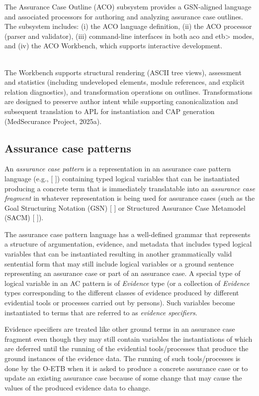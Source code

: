 \documentclass[12pt,twoside,a4paper]{article}
\begin{document}
The Assurance Case Outline (ACO) subsystem provides a GSN-aligned language and associated processors for authoring and analyzing assurance case outlines. The subsystem includes: (i) the ACO language definition, (ii) the ACO processor (parser and validator), (iii) command-line interfaces in both aco and etb\textgreater{} modes, and (iv) the ACO Workbench, which supports interactive development.\\
\strut \\
The Workbench supports structural rendering (ASCII tree views), assessment and statistics (including undeveloped elements, module references, and explicit relation diagnostics), and transformation operations on outlines. Transformations are designed to preserve author intent while supporting canonicalization and subsequent translation to APL for instantiation and CAP generation (MedSecurance Project, 2025a).

\hypertarget{assurance-case-patterns}{%
\subsection{Assurance case patterns}\label{assurance-case-patterns}}

An \emph{assurance case pattern} is a representation in an assurance case pattern language (e.g., {[} {]}) containing typed logical variables that can be instantiated producing a concrete term that is immediately translatable into an \emph{assurance case fragment} in whatever representation is being used for assurance cases (such as the Goal Structuring Notation (GSN) {[} {]} or Structured Assurance Case Metamodel (SACM) {[} {]}).

The assurance case pattern language has a well-defined grammar that represents a structure of argumentation, evidence, and metadata that includes typed logical variables that can be instantiated resulting in another grammatically valid sentential form that may still include logical variables or a ground sentence representing an assurance case or part of an assurance case. A special type of logical variable in an AC pattern is of \emph{Evidence} type (or a collection of \emph{Evidence} types corresponding to the different classes of evidence produced by different evidential tools or processes carried out by persons). Such variables become instantiated to terms that are referred to as \emph{evidence specifiers}.

Evidence specifiers are treated like other ground terms in an assurance case fragment even though they may still contain variables the instantiations of which are deferred until the running of the evidential tools/processes that produce the ground instances of the evidence data. The running of such tools/processes is done by the O-ETB when it is asked to produce a concrete assurance case or to update an existing assurance case because of some change that may cause the values of the produced evidence data to change.
\end{document}
